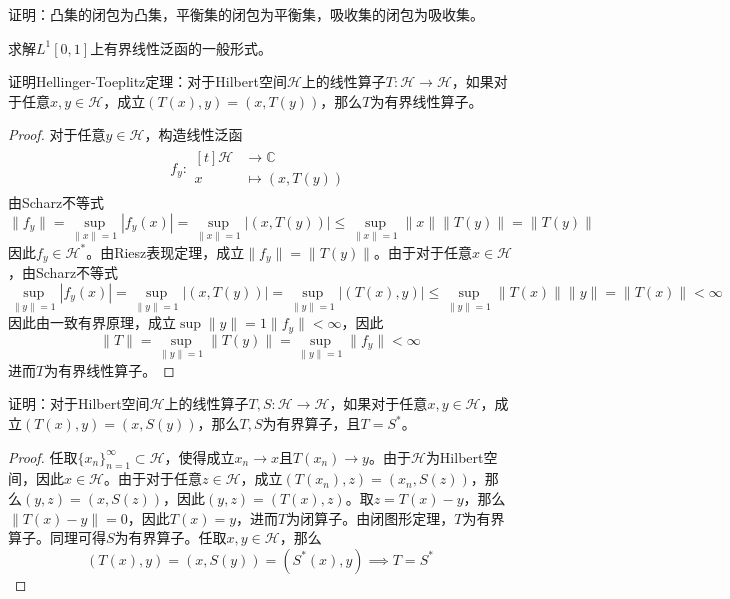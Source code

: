 \documentclass[lang = cn, scheme = chinese, 10pt]{elegantbook}
\newcommand{\C}{\mathbb{C}}  %
\newcommand{\sub}{\subset}   %
\begin{document}
\begin{proposition}
	证明：凸集的闭包为凸集，平衡集的闭包为平衡集，吸收集的闭包为吸收集。
\end{proposition}

\begin{proposition}
	求解$L^1[0,1]$上有界线性泛函的一般形式。
\end{proposition}

\begin{proposition}
	证明Hellinger-Toeplitz定理：对于Hilbert空间$\mathcal{H}$上的线性算子$T:\mathcal{H}\to\mathcal{H}$，如果对于任意$x,y\in\mathcal{H}$，成立$(T(x),y)=(x,T(y))$，那么$T$为有界线性算子。
\end{proposition}

\begin{proof}
	对于任意$y\in\mathcal{H}$，构造线性泛函
	\begin{align*}
		f_y:\begin{aligned}[t]
			\mathcal{H}&\longrightarrow \C\\
			x&\longmapsto (x,T(y))
		\end{aligned}
	\end{align*}
	由Scharz不等式
	$$
	\|f_y\|=\sup_{\|x\|=1}|f_y(x)|=\sup_{\|x\|=1}|(x,T(y))|\le \sup_{\|x\|=1}\|x\|\|T(y)\|=\|T(y)\|
	$$
	因此$f_y\in\mathcal{H}^*$。由Riesz表现定理，成立$\|f_y\|=\|T(y)\|$。由于对于任意$x\in\mathcal{H}$，由Scharz不等式
	$$
	\sup_{\|y\|=1}|f_y(x)|
	=\sup_{\|y\|=1}|(x,T(y))|
	=\sup_{\|y\|=1}|(T(x),y)|
	\le\sup_{\|y\|=1}\|T(x)\|\|y\|
	=\|T(x)\|<\infty
	$$
	因此由一致有界原理，成立$\displaystyle \sup{\|y\|=1}\|f_y\|<\infty$，因此
	$$
	\|T\|=\sup_{\|y\|=1}\|T(y)\|=\sup_{\|y\|=1}\|f_y\|<\infty
	$$
	进而$T$为有界线性算子。
\end{proof}

\begin{proposition}
	证明：对于Hilbert空间$\mathcal{H}$上的线性算子$T,S:\mathcal{H}\to\mathcal{H}$，如果对于任意$x,y\in\mathcal{H}$，成立$(T(x),y)=(x,S(y))$，那么$T,S$为有界算子，且$T=S^*$。
\end{proposition}

\begin{proof}
	任取$\{x_n\}_{n=1}^\infty\sub\mathcal{H}$，使得成立$x_n\to x$且$T(x_n)\to y$。由于$\mathcal{H}$为Hilbert空间，因此$x\in\mathcal{H}$。由于对于任意$z\in\mathcal{H}$，成立$(T(x_n),z)=(x_n,S(z))$，那么$(y,z)=(x,S(z))$，因此$(y,z)=(T(x),z)$。取$z=T(x)-y$，那么$\|T(x)-y\|=0$，因此$T(x)=y$，进而$T$为闭算子。由闭图形定理，$T$为有界算子。同理可得$S$为有界算子。任取$x,y\in\mathcal{H}$，那么
	$$
	(T(x),y)=(x,S(y))=(S^*(x),y)\implies T=S^*
	$$
\end{proof}
\end{document}
